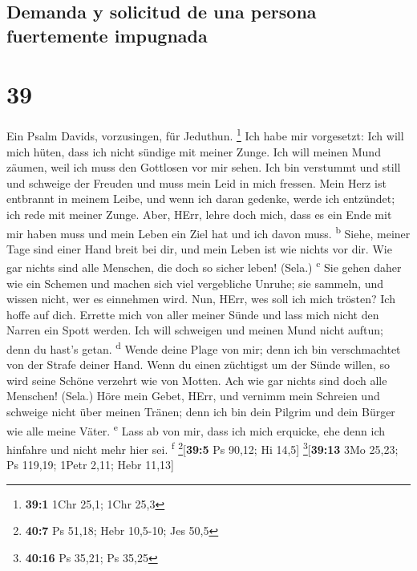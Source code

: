 \hypertarget{demanda-y-solicitud-de-una-persona-fuertemente-impugnada}{%
\subsection{Demanda y solicitud de una persona fuertemente
impugnada}\label{demanda-y-solicitud-de-una-persona-fuertemente-impugnada}}

\hypertarget{section-38}{%
\section{39}\label{section-38}}

 Ein Psalm Davids, vorzusingen, für Jeduthun. \footnote{\textbf{39:1}
  1Chr 25,1; 1Chr 25,3}  Ich habe mir vorgesetzt: Ich will
mich hüten, dass ich nicht sündige mit meiner Zunge. Ich will meinen
Mund zäumen, weil ich muss den Gottlosen vor mir sehen. 
Ich bin verstummt und still und schweige der Freuden und muss mein Leid
in mich fressen.  Mein Herz ist entbrannt in meinem Leibe,
und wenn ich daran gedenke, werde ich entzündet; ich rede mit meiner
Zunge.  Aber, HErr, lehre doch mich, dass es ein Ende mit
mir haben muss und mein Leben ein Ziel hat und ich davon muss.
\textsuperscript{b}  Siehe, meiner Tage sind einer Hand
breit bei dir, und mein Leben ist wie nichts vor dir. Wie gar nichts
sind alle Menschen, die doch so sicher leben! (Sela.)
\textsuperscript{c}  Sie gehen daher wie ein Schemen und
machen sich viel vergebliche Unruhe; sie sammeln, und wissen nicht, wer
es einnehmen wird.  Nun, HErr, wes soll ich mich trösten?
Ich hoffe auf dich.  Errette mich von aller meiner Sünde
und lass mich nicht den Narren ein Spott werden.  Ich
will schweigen und meinen Mund nicht auftun; denn du hast's getan.
\textsuperscript{d}  Wende deine Plage von mir; denn ich
bin verschmachtet von der Strafe deiner Hand.  Wenn du
einen züchtigst um der Sünde willen, so wird seine Schöne verzehrt wie
von Motten. Ach wie gar nichts sind doch alle Menschen! (Sela.)
 Höre mein Gebet, HErr, und vernimm mein Schreien und
schweige nicht über meinen Tränen; denn ich bin dein Pilgrim und dein
Bürger wie alle meine Väter. \textsuperscript{e}  Lass ab
von mir, dass ich mich erquicke, ehe denn ich hinfahre und nicht mehr
hier sei. \textsuperscript{f} \footnote{\textbf{40:7} Ps 51,18; Hebr
  10,5-10; Jes 50,5}{[}\textbf{39:5} Ps 90,12; Hi 14,5{]}
\footnote{\textbf{40:16} Ps 35,21; Ps 35,25}{[}\textbf{39:13} 3Mo 25,23;
Ps 119,19; 1Petr 2,11; Hebr 11,13{]}

